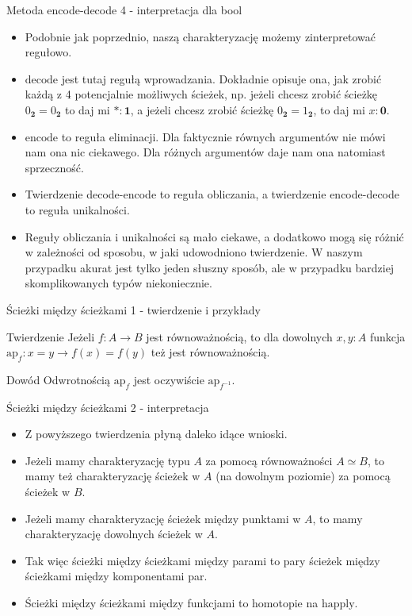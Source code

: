 \documentclass{beamer}
\newcommand{\finv}[1]{#1^{-1}}
\newcommand{\happly}{\text{happly}}
\newcommand{\encode}{\text{encode}}
\newcommand{\decode}{\text{decode}}
\begin{document}
\begin{frame}{Metoda encode-decode 4 - interpretacja dla bool}
\begin{itemize}
	\item Podobnie jak poprzednio, naszą charakteryzację możemy zinterpretować regułowo.
	\item $\decode$ jest tutaj regułą wprowadzania. Dokładnie opisuje ona, jak zrobić każdą z 4 potencjalnie możliwych ścieżek, np. jeżeli chcesz zrobić ścieżkę $0_{\textbf{2}} = 0_{\textbf{2}}$ to daj mi $* : \textbf{1}$, a jeżeli chcesz zrobić ścieżkę $0_{\textbf{2}} = 1_{\textbf{2}}$, to daj mi $x : \textbf{0}$.
	\item $\encode$ to reguła eliminacji. Dla faktycznie równych argumentów nie mówi nam ona nic ciekawego. Dla różnych argumentów daje nam ona natomiast sprzeczność.
	\item Twierdzenie decode-encode to reguła obliczania, a twierdzenie encode-decode to reguła unikalności.
	\item Reguły obliczania i unikalności są mało ciekawe, a dodatkowo mogą się różnić w zależności od sposobu, w jaki udowodniono twierdzenie. W naszym przypadku akurat jest tylko jeden słuszny sposób, ale w przypadku bardziej skomplikowanych typów niekoniecznie.
\end{itemize}
\end{frame}

\begin{frame}{Ścieżki między ścieżkami 1 - twierdzenie i przykłady}

\begin{block}{Twierdzenie}
Jeżeli $f : A \to B$ jest równoważnością, to dla dowolnych $x, y : A$ funkcja $\text{ap}_f : x = y \to f(x) = f(y)$ też jest równoważnością.
\end{block}

\begin{block}{Dowód}
Odwrotnością $\text{ap}_f$ jest oczywiście $\text{ap}_{\finv{f}}$.
\end{block}


\end{frame}

\begin{frame}{Ścieżki między ścieżkami 2 - interpretacja}
\begin{itemize}
	\item Z powyższego twierdzenia płyną daleko idące wnioski.
	\item Jeżeli mamy charakteryzację typu $A$ za pomocą równoważności $A \simeq B$, to mamy też charakteryzację ścieżek w $A$ (na dowolnym poziomie) za pomocą ścieżek w $B$.
	\item Jeżeli mamy charakteryzację ścieżek między punktami w $A$, to mamy charakteryzację dowolnych ścieżek w $A$.
	\item Tak więc ścieżki między ścieżkami między parami to pary ścieżek między ścieżkami między komponentami par.
	\item Ścieżki między ścieżkami między funkcjami to homotopie na $\happly$.
\end{itemize}
\end{frame}
\end{document}
